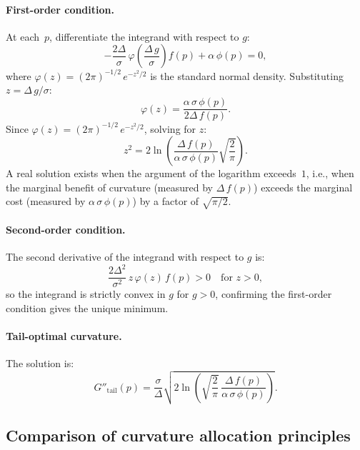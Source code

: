 \documentclass[11pt]{article}
\begin{document}
\paragraph{First-order condition.} At each~$p$, differentiate the integrand with respect to $g$:
\[
-\frac{2\Delta}{\sigma}\,\varphi\!\left(\frac{\Delta\,g}{\sigma}\right) f(p) + \alpha\,\phi(p) = 0,
\]
where $\varphi(z) = (2\pi)^{-1/2}\,e^{-z^2/2}$ is the standard normal density. Substituting $z = \Delta\,g/\sigma$:
\begin{equation}\label{eq:tail-foc}
\varphi(z) = \frac{\alpha\,\sigma\,\phi(p)}{2\Delta\,f(p)}.
\end{equation}
Since $\varphi(z) = (2\pi)^{-1/2}\,e^{-z^2/2}$, solving for $z$:
\begin{equation}\label{eq:z-tail}
z^2 = 2\ln\!\left(\frac{\Delta\,f(p)}{\alpha\,\sigma\,\phi(p)}\sqrt{\frac{2}{\pi}}\right).
\end{equation}
A real solution exists when the argument of the logarithm exceeds~$1$, i.e., when the marginal benefit of curvature (measured by $\Delta\,f(p)$) exceeds the marginal cost (measured by $\alpha\,\sigma\,\phi(p)$) by a factor of $\sqrt{\pi/2}$.

\paragraph{Second-order condition.} The second derivative of the integrand with respect to $g$ is:
\[
\frac{2\Delta^2}{\sigma^2}\,z\,\varphi(z)\,f(p) > 0 \quad \text{for } z > 0,
\]
so the integrand is strictly convex in $g$ for $g > 0$, confirming the first-order condition gives the unique minimum.

\paragraph{Tail-optimal curvature.} The solution is:
\begin{equation}\label{eq:g-tail-optimal}
\boxed{G''_{\mathrm{tail}}(p) = \frac{\sigma}{\Delta}\sqrt{2\ln\!\left(\sqrt{\frac{2}{\pi}}\,\frac{\Delta\,f(p)}{\alpha\,\sigma\,\phi(p)}\right)}.}
\end{equation}

\subsection{Comparison of curvature allocation principles}
\end{document}
